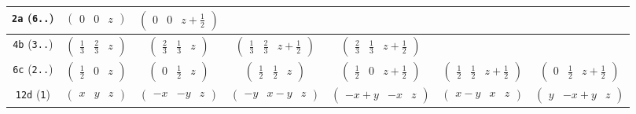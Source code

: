 \documentclass[fleqn,9pt,landscape]{jsarticle}
\begin{document}
\begin{center}
\begin{longtable}{ccccccc}
{\tt 2a} ({\tt 6..}) & $ \begin{pmatrix} 0 & 0 & z \end{pmatrix} $ & $ \begin{pmatrix} 0 & 0 & z + \frac{1}{2} \end{pmatrix} $ & $  $ & $  $ & $  $ & $  $ \\ \hline
{\tt 4b} ({\tt 3..}) & $ \begin{pmatrix} \frac{1}{3} & \frac{2}{3} & z \end{pmatrix} $ & $ \begin{pmatrix} \frac{2}{3} & \frac{1}{3} & z \end{pmatrix} $ & $ \begin{pmatrix} \frac{1}{3} & \frac{2}{3} & z + \frac{1}{2} \end{pmatrix} $ & $ \begin{pmatrix} \frac{2}{3} & \frac{1}{3} & z + \frac{1}{2} \end{pmatrix} $ & $  $ & $  $ \\ \hline
{\tt 6c} ({\tt 2..}) & $ \begin{pmatrix} \frac{1}{2} & 0 & z \end{pmatrix} $ & $ \begin{pmatrix} 0 & \frac{1}{2} & z \end{pmatrix} $ & $ \begin{pmatrix} \frac{1}{2} & \frac{1}{2} & z \end{pmatrix} $ & $ \begin{pmatrix} \frac{1}{2} & 0 & z + \frac{1}{2} \end{pmatrix} $ & $ \begin{pmatrix} \frac{1}{2} & \frac{1}{2} & z + \frac{1}{2} \end{pmatrix} $ & $ \begin{pmatrix} 0 & \frac{1}{2} & z + \frac{1}{2} \end{pmatrix} $ \\ \hline
{\tt 12d} ({\tt 1}) & $ \begin{pmatrix} x & y & z \end{pmatrix} $ & $ \begin{pmatrix} - x & - y & z \end{pmatrix} $ & $ \begin{pmatrix} - y & x - y & z \end{pmatrix} $ & $ \begin{pmatrix} - x + y & - x & z \end{pmatrix} $ & $ \begin{pmatrix} x - y & x & z \end{pmatrix} $ & $ \begin{pmatrix} y & - x + y & z \end{pmatrix} $ \\

\end{longtable}
\end{center}
\end{document}
